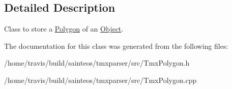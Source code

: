 \subsection{Detailed Description}
Class to store a \hyperlink{classTmx_1_1Polygon}{Polygon} of an \hyperlink{classTmx_1_1Object}{Object}. 

The documentation for this class was generated from the following files\-:\begin{DoxyCompactItemize}
\item 
/home/travis/build/sainteos/tmxparser/src/Tmx\-Polygon.\-h\item 
/home/travis/build/sainteos/tmxparser/src/Tmx\-Polygon.\-cpp\end{DoxyCompactItemize}
